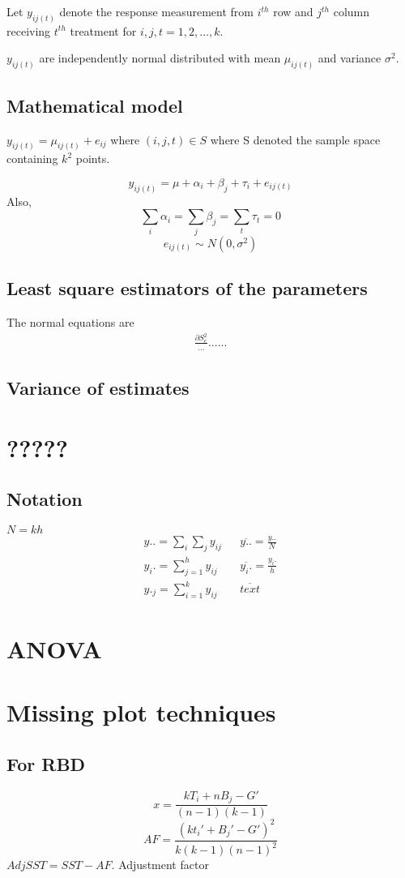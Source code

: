 \documentclass[oneside,11pt,pdftex]{book}%
\numberwithin{equation}{section}
\numberwithin{section}{chapter}
\numberwithin{equation}{chapter}
\begin{document}
Let $ y_{ij(t)} $ denote the response measurement from $ i^{th} $ row and $ j^{th} $ column receiving $ t^{th} $ treatment for $ i,j,t=1,2,\dots,k $.

$ y_{ij(t)} $ are independently normal distributed with mean $ \mu_{ij(t)} $ and variance $ \sigma^2 $.

\subsection{Mathematical model}
$ y_{ij(t)}=\mu_{ij(t)}+e_{ij} $ where $ (i,j,t)\in S $ where S denoted the sample space containing $ k^2 $ points.

\[ y_{ij(t)}=\mu+\alpha_i+\beta_j+\tau_i+e_{ij(t)} \]
Also,
\[ \sum_i \alpha_i=\sum_j \beta_j=\sum_t \tau_t=0 \]
$$ e_{ij(t)} \sim N(0,\sigma^2) $$
\subsection{Least square estimators of the parameters}
The normal equations are 
\begin{align*}
	\frac{\partial S^2_e}{...}...
	...
\end{align*}

\subsection{Variance of estimates}

\section{?????}
\subsection{Notation}
$ N=kh $
\begin{align*}
	y..=\sum_i \sum_j y_{ij} && \overline{y..}=\frac{y..}{N}\\
	y_i.=\sum_{j=1}^h y_{ij} && \overline{y_i.}=\frac{y_i.}{h}\\
	y._j=\sum_{i=1}^k y_{ij} && \overline{text} 
\end{align*}

\section{ANOVA}

\section{Missing plot techniques}

\subsection{For RBD}
\[ x=\frac{kT_i+nB_j-G'}{(n-1)(k-1)} \]
\[ AF=\frac{(kt_i'+B_j'-G')^2}{k(k-1)(n-1)^2} \]
$ Adj SST= SST-AF $.
Adjustment factor
\backmatter
\thispagestyle{empty}
\newpage
\end{document}
